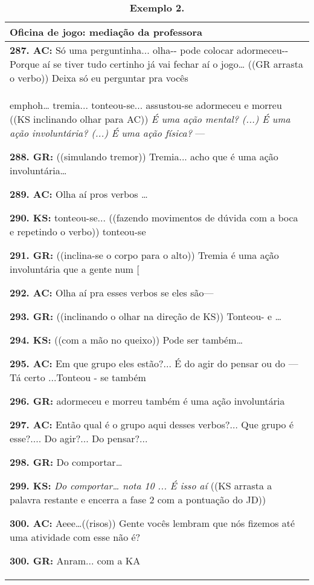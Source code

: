 \begin{table}[!htpb]
	\centering
	\small
	\begin{threeparttable}
		\caption*{\textbf{Exemplo 2.} }
		\label{tab-03}
		\begin{tabular}{@{} >{\raggedright\arraybackslash}p{} @{}}
			\toprule\noalign{}
			Oficina de jogo: mediação da professora
			\\
			\midrule\noalign{}
			
			\textbf{287. AC:} Só uma perguntinha... olha-\/- pode colocar adormeceu-\/- Porque aí se tiver tudo certinho já vai fechar aí o jogo\ldots{} ((GR arrasta o verbo)) Deixa só eu perguntar pra vocês \\emph{oh\ldots{} tremia... tonteou-se... assustou-se adormeceu e morreu} ((KS inclinando olhar para AC)) \emph{É uma ação mental? (...) É uma ação involuntária? (...) É uma ação física?} ---
			
			\textbf{288. GR:} ((simulando tremor)) Tremia... acho que é uma ação involuntária\ldots{}
			
			\textbf{289. AC:} Olha aí pros verbos \ldots{}
			
			\textbf{290. KS:} tonteou-se... ((fazendo movimentos de dúvida com a boca e repetindo o verbo)) tonteou-se
			
			\textbf{291. GR:} ((inclina-se o corpo para o alto)) Tremia é uma ação involuntária que a gente num {[}
			
			\textbf{292. AC:} Olha aí pra esses verbos se eles são---
			
			\textbf{293. GR:} ((inclinando o olhar na direção de KS)) Tonteou- e \ldots{}
			
			\textbf{294. KS:} ((com a mão no queixo)) Pode ser também\ldots{}
			
			\textbf{295. AC:} Em que grupo eles estão?... É do agir do pensar ou do --- Tá certo ...Tonteou - se também
			
			\textbf{296. GR:} adormeceu e morreu também é uma ação involuntária
			
			\textbf{297. AC:} Então qual é o grupo aqui desses verbos?... Que grupo é esse?.... Do agir?... Do pensar?...
			
			\textbf{298. GR:} Do comportar\ldots{}
			
			\textbf{299. KS:} \emph{Do comportar\ldots{} nota 10 ... É isso aí} ((KS arrasta a palavra restante e encerra a fase 2 com a pontuação do JD))
			
			\textbf{300. AC:} Aeee\ldots((risos)) Gente vocês lembram que nós fizemos até uma atividade com esse não é?
			
			\textbf{300. GR:} Anram... com a KA\label{anchor-8}{} \\
			
			\bottomrule
		\end{tabular}
	\end{threeparttable}
\end{table}
